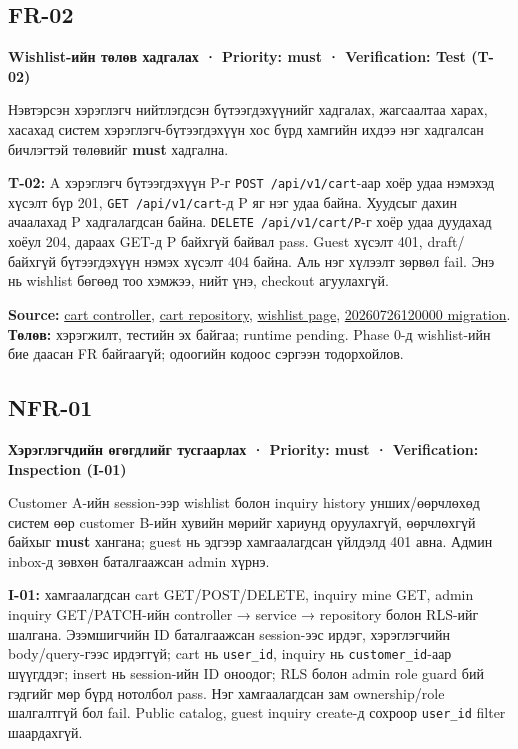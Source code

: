 \subsection{FR-02}\label{doc4-fr-02}

\textbf{Wishlist-ийн төлөв хадгалах · Priority: must · Verification:
Test (T-02)}

Нэвтэрсэн хэрэглэгч нийтлэгдсэн бүтээгдэхүүнийг хадгалах, жагсаалтаа
харах, хасахад систем хэрэглэгч-бүтээгдэхүүн хос бүрд хамгийн ихдээ нэг
хадгалсан бичлэгтэй төлөвийг \textbf{must} хадгална.

\textbf{T-02:} A хэрэглэгч бүтээгдэхүүн P-г
\nolinkurl{POST /api/v1/cart}-аар хоёр удаа нэмэхэд хүсэлт бүр 201,
\nolinkurl{GET /api/v1/cart}-д P яг нэг удаа байна. Хуудсыг дахин
ачаалахад P хадгалагдсан байна. \nolinkurl{DELETE /api/v1/cart/P}-г хоёр
удаа дуудахад хоёул 204, дараах GET-д P байхгүй байвал pass. Guest
хүсэлт 401, draft/байхгүй бүтээгдэхүүн нэмэх хүсэлт 404 байна. Аль нэг
хүлээлт зөрвөл fail. Энэ нь wishlist бөгөөд тоо хэмжээ, нийт үнэ,
checkout агуулахгүй.

\textbf{Source:}
\href{../../../backend/api/src/controllers/cart.controller.ts}{cart
controller},
\href{../../../backend/api/src/repositories/supabase/cart.repository.ts}{cart
repository}, \href{../../../apps/web/src/app/wishlist/page.tsx}{wishlist
page},
\href{../../../supabase/migrations/20260726120000_inquiry_customer_and_cart.sql}{20260726120000
migration}. \textbf{Төлөв:} хэрэгжилт, тестийн эх байгаа; runtime
pending. Phase 0-д wishlist-ийн бие даасан FR байгаагүй; одоогийн кодоос
сэргээн тодорхойлов.

\subsection{NFR-01}\label{doc4-nfr-01}

\textbf{Хэрэглэгчдийн өгөгдлийг тусгаарлах · Priority: must ·
Verification: Inspection (I-01)}

Customer A-ийн session-ээр wishlist болон inquiry history
унших/өөрчлөхөд систем өөр customer B-ийн хувийн мөрийг хариунд
оруулахгүй, өөрчлөхгүй байхыг \textbf{must} хангана; guest нь эдгээр
хамгаалагдсан үйлдэлд 401 авна. Админ inbox-д зөвхөн баталгаажсан admin
хүрнэ.

\textbf{I-01:} хамгаалагдсан cart GET/POST/DELETE, inquiry mine GET,
admin inquiry GET/PATCH-ийн controller → service → repository болон
RLS-ийг шалгана. Эзэмшигчийн ID баталгаажсан session-ээс ирдэг,
хэрэглэгчийн body/query-гээс ирдэггүй; cart нь \nolinkurl{user_id},
inquiry нь \nolinkurl{customer_id}-аар шүүгддэг; insert нь session-ийн
ID оноодог; RLS болон admin role guard бий гэдгийг мөр бүрд нотолбол
pass. Нэг хамгаалагдсан зам ownership/role шалгалтгүй бол fail. Public
catalog, guest inquiry create-д сохроор \nolinkurl{user_id} filter
шаардахгүй.

